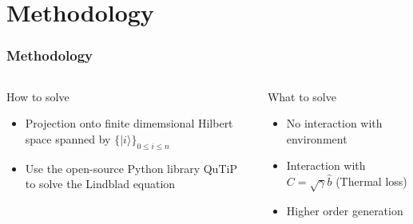 \documentclass{beamer}
\newcommand*\ket[1]{|{#1}\rangle}
\begin{document}
\section{Methodology}
\begin{frame}[c]
  \frametitle{Methodology}
  \begin{columns}
    \begin{column}{0.5\textwidth}
      \begin{block}{How to solve}
      \begin{itemize}
        \item Projection onto finite dimemsional Hilbert space spanned by $\{\ket{i}\}_{0\le i\le n}$
        \item Use the open-source Python library QuTiP to solve the Lindblad equation
      \end{itemize}
      \end{block}
    \end{column}
    \pause
    \begin{column}{0.5\textwidth}
      \begin{block}{What to solve}
      \begin{itemize}
        \item No interaction with environment
        \item Interaction with $C=\sqrt{\gamma}\hat{b}$ (Thermal loss)
        \item Higher order generation
      \end{itemize}
      \end{block}
    \end{column}
  \end{columns}
\end{frame}
\end{document}
